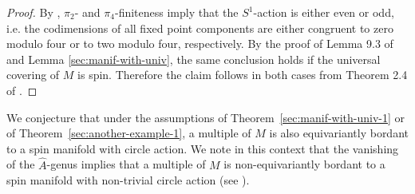 \documentclass[a4paper, 11pt]{amsart}
\theoremstyle{definition}
\theoremstyle{remark}
\numberwithin{equation}{section}
\begin{document}
\begin{proof}
  By \cite[Theorem VI]{MR246324}, \(\pi_2\)- and \(\pi_4\)-finiteness imply that the \(S^1\)-action is either even or odd, i.e. the codimensions of all fixed point components are either congruent to zero modulo four or to two modulo four, respectively.
  By the proof of Lemma 9.3 of \cite{MR954493} and Lemma \ref{sec:manif-with-univ}, the same conclusion holds if the universal covering of \(M\) is spin.
  Therefore the claim follows in both cases from Theorem 2.4 of \cite{MR882700}.
\end{proof}

We conjecture that under the assumptions of Theorem~\ref{sec:manif-with-univ-1} or of Theorem~\ref{sec:another-example-1}, a multiple of \(M\) is also equivariantly bordant to a spin manifold with  circle action.
We note in this context that the vanishing of the \(\hat{A}\)-genus implies that a multiple of \(M\) is non-equivariantly bordant to a spin manifold with non-trivial circle action (see \cite[Section 2.3]{MR0278334}).


{}

\end{document}
